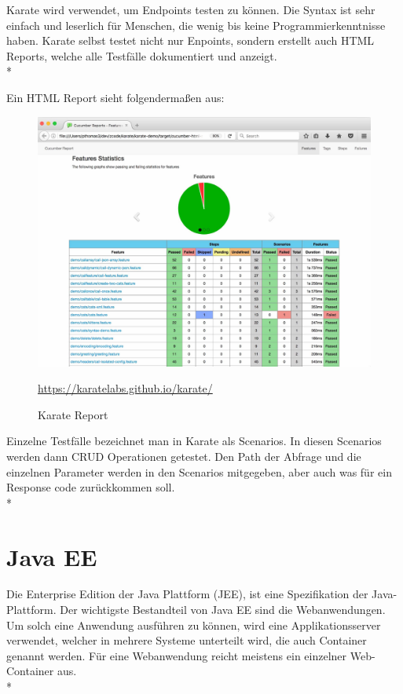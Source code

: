 Karate wird verwendet, um Endpoints testen zu können. Die Syntax ist sehr einfach und leserlich für Menschen, die wenig bis keine Programmierkenntnisse haben.
Karate selbst testet nicht nur Enpoints, sondern erstellt auch HTML Reports, welche alle Testfälle dokumentiert und anzeigt. \\*

Ein HTML Report sieht folgendermaßen aus:

\begin{figure}[htp]
    \centering
    \includegraphics[scale=0.18]{pics/karate-maven-report.jpg}
    \caption{Karate Report}
    \small \url{https://karatelabs.github.io/karate/} 
    \label{fig:impl:karatereport}
\end{figure}

Einzelne Testfälle bezeichnet man in Karate als Scenarios. In diesen Scenarios werden dann CRUD Operationen getestet. Den Path der Abfrage und die einzelnen 
Parameter werden in den Scenarios mitgegeben, aber auch was für ein Response code zurückkommen soll. \\*


\pagebreak

\section{Java EE}
\author{David Ignjatovic} 

Die Enterprise Edition der Java Plattform (JEE), ist eine Spezifikation der Java-Plattform. 
Der wichtigste Bestandteil von Java EE sind die Webanwendungen. Um solch eine Anwendung ausführen zu können, wird eine Applikationsserver verwendet, welcher 
in mehrere Systeme unterteilt wird, die auch Container genannt werden. Für eine Webanwendung reicht meistens ein einzelner Web-Container aus. \\*

